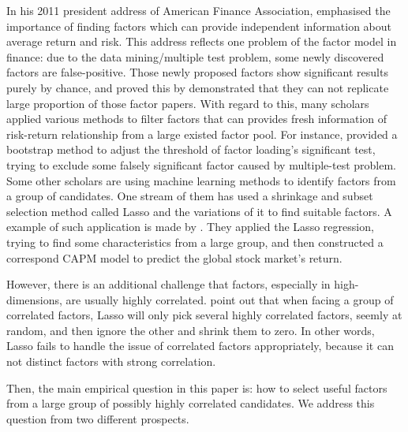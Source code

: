 In his 2011 president address of American Finance Association, \citeauthor{Cochrane2011} emphasised the importance of finding factors which can provide independent information about average return and risk.
This address reflects one problem of the factor model in finance: due to the data mining/multiple test problem, some newly discovered factors are false-positive.
Those newly proposed factors show significant results purely by chance, and  proved this by demonstrated that they can not replicate large proportion of those factor papers.
With regard to this, many scholars applied various methods to filter factors that can provides fresh information of risk-return relationship from a large existed factor pool.
For instance,  provided a bootstrap method to adjust the threshold of factor loading's significant test, trying to exclude some falsely significant factor caused by multiple-test problem.
Some other scholars are using machine learning methods to identify factors from a group of candidates.
One stream of them has used a shrinkage and subset selection method called Lasso \cite{Tibshirani1996} and the variations of it to find suitable factors.
A example of such application is made by .
They applied the Lasso regression, trying to find some characteristics from a large group, and then constructed a correspond CAPM model to predict the global stock market's return.

However, there is an additional challenge that factors, especially in high-dimensions, are usually highly correlated.
 point out that when facing a group of correlated factors, Lasso will only pick several highly correlated factors, seemly at random, and then ignore the other and shrink them to zero. 
In other words, Lasso fails to handle the issue of correlated factors appropriately, because it can not distinct factors with strong correlation.

Then, the main empirical question in this paper is: how to select useful factors from a large group of possibly highly correlated candidates.
We address this question from two different prospects.

